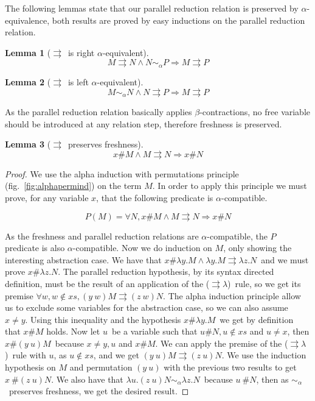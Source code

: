 \documentclass[preprint,10pt]{sigplanconf}
\newcommand{\alp}{\ensuremath{\alpha}}
\newcommand{\lam}{\ensuremath{\lambda}}
\newcommand{\alpsym}{\ensuremath{\sim_\alpha}}
\newcommand{\p}{\ensuremath{\rightrightarrows}}
\newtheorem{lemma}{Lemma}
\begin{document}
The following lemmas state that our parallel reduction relation is preserved by \alp-equivalence, both results are proved by easy inductions on the parallel reduction relation.

\begin{lemma}[\p\ is right \alp-equivalent]
\label{prightalpha}
\[ M \p N \wedge N \alpsym P \Rightarrow M \p P \]
\end{lemma}

\begin{lemma}[\p\  is left \alp-equivalent]
\label{pleftalpha}
\[ M \alpsym N \wedge N \p P \Rightarrow M \p P \]
\end{lemma}

As the parallel reduction relation basically applies $\beta$-contractions, no free variable should be introduced at any relation step, therefore freshness is preserved. 

\begin{lemma}[\p\   preserves freshness]
\label{pfresh}
\[ x \# M \wedge M \p N  \Rightarrow x \# N \]
\end{lemma}

\begin{proof}
  We use the alpha induction with permutations principle (fig.~\ref{fig:alphapermind}) on the term $M$. In order to apply this principle we must prove, for any variable $x$, that the following predicate is \alp-compatible.

\[ P(M) = \forall N, x \# M \wedge M \p N \Rightarrow x \# N \]

As the freshness and parallel reduction relations are \alp-compatible, the $P$ predicate is also \alp-compatible. 
Now we do  induction on  $M$, only showing the interesting abstraction case. 
We have that $x \# \lam y . M \wedge \lam y . M \p \lam z . N$\ and we must prove $x \# \lam z . N$.  
The parallel reduction hypothesis, by its syntax directed definition, must be the result of an application of the (\p\lam)\ rule, so we get its premise $\forall w, w \not\in xs, (y\ w) M \p (z\ w) N$. 
The alpha induction principle allow us to exclude some variables for the abstraction case, so we can also assume $ x\neq y$. 
Using this inequality and the hypothesis $x \# \lam y . M$\ we get by definition that $x\# M$ holds. 
Now let $u$\ be a variable such that $u \# N, u \not\in xs$ and $u \neq x$, then $x \# (y\ u) M$\ because $x \neq y,u$ and $x \# M$. We can apply the premise of the (\p\lam)\ rule with $u$, as $u \not\in xs$, and we get $(y\ u) M \p (z\ u) N$. We use the induction hypothesis on $M$ and permutation $(y\ u)$ with the previous two results to get $x\ \# (z\ u) N$. We also have that $\lam u .(z\ u)N \alpsym \lam z. N$\ because $u\ \# N$, then as \alpsym\ preserves freshness, we get the desired result.
\end{proof}
\end{document}
